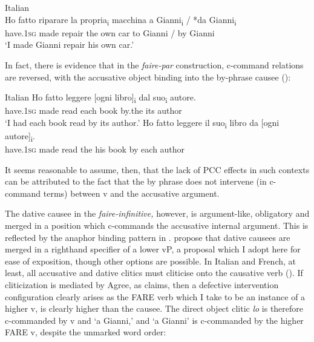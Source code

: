 \documentclass[output=paper,colorlinks,citecolor=brown,nonflat]{./langscibook}
\begin{document}
\ea%
    \label{ex:sheehan:20}
    Italian \citep{Burzio1986}\\
    \gll    Ho   fatto   riparare   la   propria\textsubscript{i} macchina  a  Gianni\textsubscript{i} / *da   Gianni\textsubscript{i}\\
            have.\textsc{1sg}   made   repair   the  own   car   to   Gianni /  by   Gianni\\
    \glt    ‘I made Gianni repair his own car.’ 
\z

In fact, there is evidence that in the \textit{faire-par} construction, c-command relations are reversed, with the accusative object binding into the by-phrase causee (\citealt{SheehanCyrino2016}):

\ea%
    \label{ex:sheehan:21}
    Italian \citep[286]{SheehanCyrino2016}
    \ea\label{ex:sheehan:21a}
    \gll    Ho   fatto   leggere [ogni   libro]\textsubscript{i} dal   suo\textsubscript{i}   autore.\\
            have.\textsc{1sg}   made   read   {\db}each book   by.the   its   author\\
    \glt    ‘I had each book read by its author.’
    \ex\label{ex:sheehan:21b}
    \gll    *Ho   fatto   leggere   il  suo\textsubscript{i} libro   da   [ogni  autore]\textsubscript{i}.\\
            have.\textsc{1sg}   made   read   the  his   book   by   {\db}each   author\\
    \z
\z

It seems reasonable to assume, then, that the lack of PCC effects in such contexts can be attributed to the fact that the by phrase does not intervene (in c-command terms) between v and the accusative argument. 

The dative causee in the \textit{faire-infinitive,} however, is argument-like, obligatory and merged in a position which c-commands the accusative internal argument. This is reflected by the anaphor binding pattern in . \citet{FolliHarley2007} propose that dative causees are merged in a righthand specifier of a lower vP, a proposal which I adopt here for ease of exposition, though other options are possible. In Italian and French, at least, all accusative and dative clitics must cliticise onto the causative verb (\citealt{Kayne1975, Burzio1986, Guasti1993}). If cliticization is mediated by Agree, as \citet{Preminger2019} claims, then a defective intervention configuration clearly arises as the FARE verb which I take to be an instance of a higher v, is clearly higher than the causee. The direct object clitic \textit{lo} is therefore c-commanded by v and ‘a Gianni,’ and ‘a Gianni’ is c-commanded by the higher FARE v, despite the unmarked word order:
\end{document}
